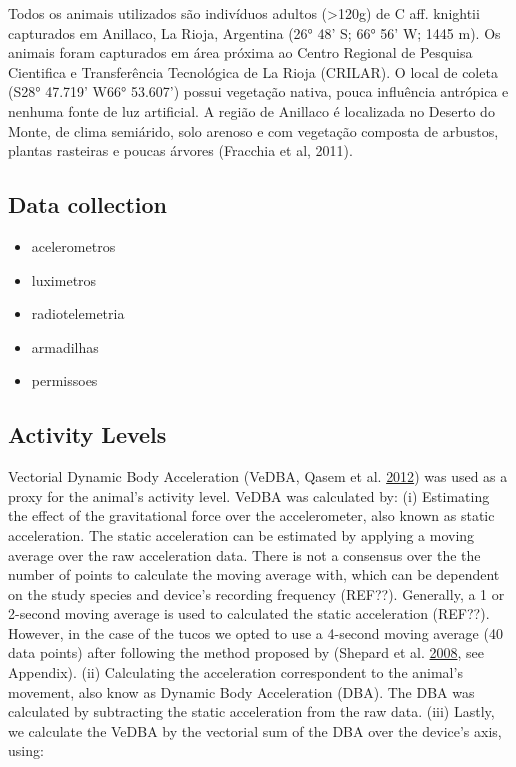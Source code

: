 \documentclass[msc,numbers,hidelinks]{coppe}
\providecommand{\tightlist}{%
  \setlength{\itemsep}{0pt}\setlength{\parskip}{0pt}}
\begin{document}
  Todos os animais utilizados são indivíduos adultos (\textgreater120g) de C aff. knightii capturados em Anillaco, La Rioja, Argentina (26° 48' S; 66° 56' W; 1445 m). Os animais foram capturados em área próxima ao Centro Regional de Pesquisa Cientifica e Transferência Tecnológica de La Rioja (CRILAR). O local de coleta (S28° 47.719' W66° 53.607') possui vegetação nativa, pouca influência antrópica e nenhuma fonte de luz artificial. A região de Anillaco é localizada no Deserto do Monte, de clima semiárido, solo arenoso e com vegetação composta de arbustos, plantas rasteiras e poucas árvores (Fracchia et al, 2011).

  \hypertarget{data-collection}{%
  \subsection{Data collection}\label{data-collection}}
  \begin{itemize}
  \tightlist
  \item
    acelerometros
  \item
    luximetros
  \item
    radiotelemetria
  \item
    armadilhas
  \item
    permissoes
  \end{itemize}
  \hypertarget{activity-levels}{%
  \subsection{Activity Levels}\label{activity-levels}}

  Vectorial Dynamic Body Acceleration (VeDBA, Qasem et al. \protect\hyperlink{ref-qasemTriAxialDynamicAcceleration2012}{2012}) was used as a proxy for the animal's activity level. VeDBA was calculated by: (i) Estimating the effect of the gravitational force over the accelerometer, also known as static acceleration. The static acceleration can be estimated by applying a moving average over the raw acceleration data. There is not a consensus over the the number of points to calculate the moving average with, which can be dependent on the study species and device's recording frequency (REF??). Generally, a 1 or 2-second moving average is used to calculated the static acceleration (REF??). However, in the case of the tucos we opted to use a 4-second moving average (40 data points) after following the method proposed by (Shepard et al. \protect\hyperlink{ref-shepardDerivationBodyMotion2008}{2008}, see Appendix). (ii) Calculating the acceleration correspondent to the animal's movement, also know as Dynamic Body Acceleration (DBA). The DBA was calculated by subtracting the static acceleration from the raw data. (iii) Lastly, we calculate the VeDBA by the vectorial sum of the DBA over the device's axis, using:
\end{document}
